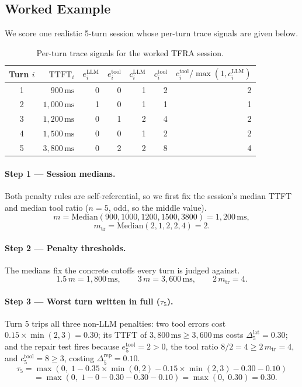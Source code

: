 \documentclass[11pt,a4paper]{article}
\begin{document}
\subsection{Worked Example}
\label{sec:tfra-example}

We score one realistic 5-turn session whose per-turn trace signals are
given below.

\begin{table}[h!]
\centering
\caption{Per-turn trace signals for the worked TFRA session.}
\label{tab:tfra-inputs}
\begin{tabular}{@{}crrrrrr@{}}
\toprule
Turn $i$ & $\text{TTFT}_i$ & $e^{\text{LLM}}_i$ & $e^{\text{tool}}_i$
  & $c^{\text{LLM}}_i$ & $c^{\text{tool}}_i$
  & $c^{\text{tool}}_i / \max(1, c^{\text{LLM}}_i)$ \\
\midrule
1 & $900\,\text{ms}$   & 0 & 0 & 1 & 2 & 2 \\
2 & $1{,}000\,\text{ms}$ & 1 & 0 & 1 & 1 & 1 \\
3 & $1{,}200\,\text{ms}$ & 0 & 1 & 2 & 4 & 2 \\
4 & $1{,}500\,\text{ms}$ & 0 & 0 & 1 & 2 & 2 \\
5 & $3{,}800\,\text{ms}$ & 0 & 2 & 2 & 8 & 4 \\
\bottomrule
\end{tabular}
\end{table}

\paragraph{Step 1 --- Session medians.}
Both penalty rules are self-referential, so we first fix the session's
median TTFT and median tool ratio ($n = 5$, odd, so the middle value).
\[
  m = \text{Median}(900, 1000, 1200, 1500, 3800) = 1{,}200\,\text{ms},
\]
\[
  m_{\text{tr}} = \text{Median}(2, 1, 2, 2, 4) = 2.
\]

\paragraph{Step 2 --- Penalty thresholds.}
The medians fix the concrete cutoffs every turn is judged against.
\[
  1.5\,m = 1{,}800\,\text{ms}, \qquad
  3\,m = 3{,}600\,\text{ms}, \qquad
  2\,m_{\text{tr}} = 4.
\]

\paragraph{Step 3 --- Worst turn written in full ($\tau_5$).}
Turn 5 trips all three non-LLM penalties: two tool errors cost
$0.15 \times \min(2,3) = 0.30$; its TTFT of $3{,}800\,\text{ms} \geq
3{,}600\,\text{ms}$ costs $\Delta^{\text{lat}}_5 = 0.30$; and the repair
test fires because $e^{\text{tool}}_5 = 2 > 0$, the tool ratio
$8/2 = 4 \geq 2\,m_{\text{tr}} = 4$, and $c^{\text{tool}}_5 = 8 \geq 3$,
costing $\Delta^{\text{rep}}_5 = 0.10$.
\[
  \tau_5 = \max\!\left(0,\;
    1 - 0.35 \times \min(0, 2) - 0.15 \times \min(2, 3) - 0.30 - 0.10
  \right)
\]
\[
  \phantom{\tau_5}
  = \max(0,\; 1 - 0 - 0.30 - 0.30 - 0.10)
  = \max(0,\; 0.30)
  = 0.30.
\]
\end{document}
